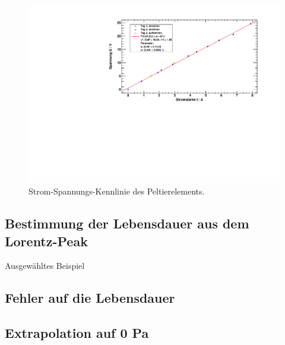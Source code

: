 \begin{figure}[H]
\begin{center}
  \includegraphics[width=\textwidth]{../img/graph_U-I.pdf}
  \caption{Strom-Spannungs-Kennlinie des Peltierelements.}
  \label{img:UI}
\end{center}
\end{figure}




\subsection{Bestimmung der Lebensdauer aus dem Lorentz-Peak}
Ausgewähltes Beispiel
\subsection{Fehler auf die Lebensdauer}
\subsection{Extrapolation auf 0 Pa}